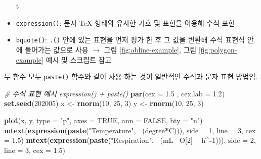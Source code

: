 \documentclass[
  11pt,
]{krantz}
\makeatletter
\newenvironment{Shaded}{\begin{snugshade}}{\end{snugshade}}
\newcommand{\CommentTok}[1]{\textcolor[rgb]{0.37,0.37,0.37}{\textit{#1}}}
\newcommand{\DataTypeTok}[1]{\textcolor[rgb]{0.27,0.27,0.27}{#1}}
\newcommand{\DecValTok}[1]{\textcolor[rgb]{0.06,0.06,0.06}{#1}}
\newcommand{\FloatTok}[1]{\textcolor[rgb]{0.06,0.06,0.06}{#1}}
\newcommand{\KeywordTok}[1]{\textcolor[rgb]{0.27,0.27,0.27}{\textbf{#1}}}
\newcommand{\NormalTok}[1]{#1}
\newcommand{\OperatorTok}[1]{\textcolor[rgb]{0.43,0.43,0.43}{\textbf{#1}}}
\newcommand{\OtherTok}[1]{\textcolor[rgb]{0.37,0.37,0.37}{#1}}
\newcommand{\StringTok}[1]{\textcolor[rgb]{0.5,0.5,0.5}{#1}}
\newenvironment{kframe}{%
\medskip{}
\setlength{\fboxsep}{.8em}
 \def\at@end@of@kframe{}%
 \ifinner\ifhmode%
  \def\at@end@of@kframe{\end{minipage}}%
  \begin{minipage}{\columnwidth}%
 \fi\fi%
 \def\FrameCommand##1{\hskip\@totalleftmargin \hskip-\fboxsep
 \colorbox{shadecolor}{##1}\hskip-\fboxsep
     \hskip-\linewidth \hskip-\@totalleftmargin \hskip\columnwidth}%
 \MakeFramed {\advance\hsize-\width
   \@totalleftmargin\z@ \linewidth\hsize
   \@setminipage}}%
 {\par\unskip\endMakeFramed%
 \at@end@of@kframe}
\renewenvironment{quote}{\begin{kframe}}{\end{kframe}}
\makeatother
\begin{document}
\begin{itemize}
t
\item
  \texttt{expression()}: 문자 TeX 형태와 유사한 기호 및 표현을 이용해 수식 표현
\item
  \texttt{bquote()}: \texttt{.()} 안에 있는 표현을 먼저 평가 한 후 그 값을 변환해 수식 표현식 안에 들어가는 값으로 사용 \(\rightarrow\) 그림 \ref{fig:abline-example}, 그림 \ref{fig:polygon-example} 예시 및 스크립트 참고
\end{itemize}

\begin{quote}
두 함수 모두 \texttt{paste()} 함수와 같이 사용 하는 것이 일반적인 수식과 문자 표현 방법임.
\end{quote}

\footnotesize

\begin{Shaded}
\begin{Highlighting}[]
\CommentTok{# 수식 표현 예시 expression() + paste()}
\KeywordTok{par}\NormalTok{(}\DataTypeTok{cex =} \FloatTok{1.5}\NormalTok{ ,}
    \DataTypeTok{cex.lab =} \FloatTok{1.2}\NormalTok{)}
\KeywordTok{set.seed}\NormalTok{(}\DecValTok{202005}\NormalTok{)}
\NormalTok{x <-}\StringTok{ }\KeywordTok{rnorm}\NormalTok{(}\DecValTok{10}\NormalTok{, }\DecValTok{25}\NormalTok{, }\DecValTok{3}\NormalTok{)}
\NormalTok{y <-}\StringTok{ }\KeywordTok{rnorm}\NormalTok{(}\DecValTok{10}\NormalTok{, }\DecValTok{25}\NormalTok{, }\DecValTok{3}\NormalTok{)}

\KeywordTok{plot}\NormalTok{(x, y,}
     \DataTypeTok{type =} \StringTok{"p"}\NormalTok{,}
     \DataTypeTok{axes =} \OtherTok{TRUE}\NormalTok{,}
     \DataTypeTok{ann =} \OtherTok{FALSE}\NormalTok{,}
     \DataTypeTok{bty =} \StringTok{"n"}\NormalTok{)}
\KeywordTok{mtext}\NormalTok{(}\KeywordTok{expression}\NormalTok{(}\KeywordTok{paste}\NormalTok{(}\StringTok{"Temperature"}\NormalTok{, }\OperatorTok{~}\NormalTok{(degree}\OperatorTok{*}\NormalTok{C))),}
      \DataTypeTok{side =} \DecValTok{1}\NormalTok{, }\DataTypeTok{line =} \DecValTok{3}\NormalTok{, }\DataTypeTok{cex =} \FloatTok{1.5}\NormalTok{)}
\KeywordTok{mtext}\NormalTok{(}\KeywordTok{expression}\NormalTok{(}\KeywordTok{paste}\NormalTok{(}\StringTok{"Respiration"}\NormalTok{, }\OperatorTok{~}\NormalTok{(mL }\OperatorTok{~}\NormalTok{O[}\DecValTok{2}\NormalTok{] }\OperatorTok{~}\StringTok{ }\NormalTok{h}\OperatorTok{^-}\DecValTok{1}\NormalTok{))),}
      \DataTypeTok{side =} \DecValTok{2}\NormalTok{,}
      \DataTypeTok{line =} \DecValTok{3}\NormalTok{,}
      \DataTypeTok{cex =} \FloatTok{1.5}\NormalTok{)}
\end{Highlighting}
\end{Shaded}
\end{document}
